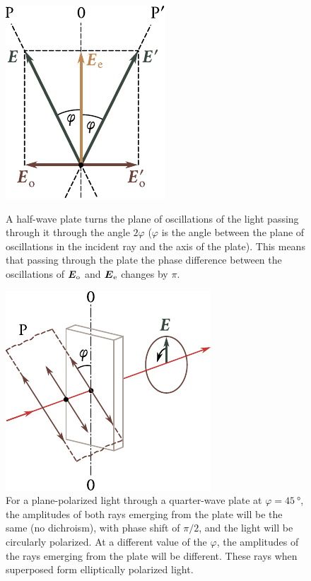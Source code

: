 \begin{figure}[t]
	\begin{minipage}[t]{0.44\linewidth}
		\begin{center}
			\includegraphics[scale=1]{figures/ch_19/fig_19_14.pdf}
            \caption[]{A half-wave plate turns the plane of oscillations of the light passing through it through the angle $2\varphi$ ($\varphi$ is the angle between the plane of oscillations in the incident ray and the axis of the plate). This means that passing through the plate the phase difference between the oscillations of $\boldsymbol{E}_{\text{o}}$ and $\boldsymbol{E}_{\text{e}}$ changes by $\pi$.}
			\label{fig:19_14}
		\end{center}
	\end{minipage}
	\hfill{ }%
	\begin{minipage}[t]{0.52\linewidth}
		\begin{center}
			\includegraphics[scale=1]{figures/ch_19/fig_19_15.pdf}
			\caption[]{For a plane-polarized light through a quarter-wave plate at $\varphi=\SI{45}{\degree}$, the amplitudes of both rays emerging from the plate will be the same (no dichroism), with phase shift of $\pi/2$, and the light will be circularly polarized. At a different value of the $\varphi$, the amplitudes of the rays emerging from the plate will be different. These rays when superposed form elliptically polarized light.}
			\label{fig:19_15}
		\end{center}
	\end{minipage}
\vspace{-0.4cm}
\end{figure}


